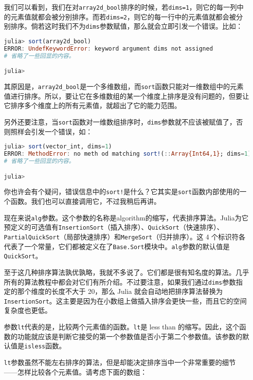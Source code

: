 我们可以看到，我们在对\verb`array2d_bool`排序的时候，若\verb`dims=1`，则它的每一列中的元素值就都会被分别排序。而若\verb`dims=2`，则它的每一行中的元素值就都会被分别排序。倘若这时我们不为\verb`dims`参数赋值，那么就会立即引发一个错误。比如：

\begin{lstlisting}[language=julia]
julia> sort(array2d_bool)
ERROR: UndefKeywordError: keyword argument dims not assigned
# 省略了一些回显的内容。

julia> 
\end{lstlisting}

其原因是，\verb`array2d_bool`是一个多维数组，而\verb`sort`函数只能对一维数组中的元素值进行排序。所以，要让它在多维数组的某一个维度上排序是没有问题的，但要让它排序多个维度上的所有元素值，就超出了它的能力范围。

另外还要注意，当\verb`sort`函数对一维数组排序时，\verb`dims`参数就不应该被赋值了，否则照样会引发一个错误，如：

\begin{lstlisting}[language=julia]
julia> sort(vector_int, dims=1)
ERROR: MethodError: no meth od matching sort!(::Array{Int64,1}; dims=1)
# 省略了一些回显的内容。

julia> 
\end{lstlisting}

你也许会有个疑问，错误信息中的\verb`sort!`是什么？它其实是\verb`sort`函数内部使用的一个函数。我们也可以直接调用它，不过我稍后再讲。

现在来说\verb`alg`参数。这个参数的名称是algorithm的缩写，代表排序算法。Julia为它预定义的可选值有\verb`InsertionSort`（插入排序）、\verb`QuickSort`（快速排序）、\verb`PartialQuickSort`（局部快速排序）和\verb`MergeSort`（归并排序）。这 4 个标识符各代表了一个常量，它们都被定义在了\verb`Base.Sort`模块中。\verb`alg`参数的默认值是\verb`QuickSort`。

至于这几种排序算法孰优孰略，我就不多说了。它们都是很有知名度的算法。几乎所有的算法教程中都会对它们有所介绍。不过要注意，如果我们通过\verb`dims`参数指定的那个维度的长度不大于 20，那么 Julia 就会自动地把排序算法替换为\verb`InsertionSort`。这主要是因为在小数组上做插入排序会更快一些，而且它的空间复杂度也更低。

参数\verb`lt`代表的是，比较两个元素值的函数。\verb`lt`是 less than 的缩写。因此，这个函数的功能就应该是判断它接受的第一个参数值是否小于第二个参数值。该参数的默认值是\verb`isless`函数。

\verb`lt`参数虽然不能左右排序的算法，但是却能决定排序当中一个非常重要的细节——怎样比较各个元素值。请考虑下面的数组：

